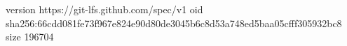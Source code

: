 version https://git-lfs.github.com/spec/v1
oid sha256:66cdd081fe73f967e824e90d80de3045b6c8d53a748ed5baa05cfff305932bc8
size 196704
